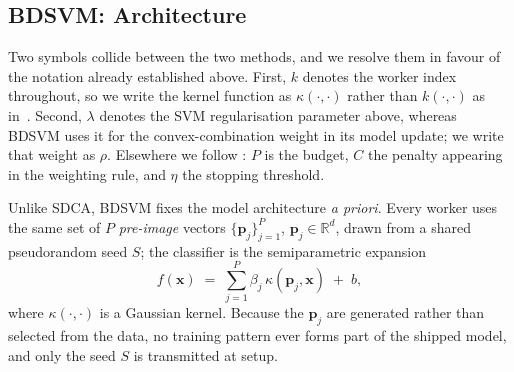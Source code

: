 %
%
%

\subsection{BDSVM: Architecture}

Two symbols collide between the two methods, and we resolve them in favour of
the notation already established above. First, $k$ denotes the worker index
throughout, so we write the kernel function as $\kappa(\cdot,\cdot)$ rather than
$k(\cdot,\cdot)$ as in~\cite{navia2022bdsvm}. Second, $\lambda$ denotes the SVM
regularisation parameter above, whereas BDSVM uses it for the convex-combination
weight in its model update; we write that weight as $\rho$. Elsewhere we follow
\cite{navia2022bdsvm}: $P$ is the budget, $C$ the penalty appearing in the
weighting rule, and $\eta$ the stopping threshold.

Unlike SDCA, BDSVM fixes the model architecture \emph{a priori}. Every worker
uses the same set of $P$ \emph{pre-image} vectors $\{\mathbf{p}_j\}_{j=1}^{P}$,
$\mathbf{p}_j \in \mathbb{R}^d$, drawn from a shared pseudorandom seed $S$; the
classifier is the semiparametric expansion
\begin{equation}
  f(\mathbf{x}) \;=\; \sum_{j=1}^{P} \beta_j\,\kappa(\mathbf{p}_j, \mathbf{x}) \;+\; b ,
\end{equation}
where $\kappa(\cdot,\cdot)$ is a Gaussian kernel. Because the $\mathbf{p}_j$ are
generated rather than selected from the data, no training pattern ever forms
part of the shipped model, and only the seed $S$ is transmitted at setup.

